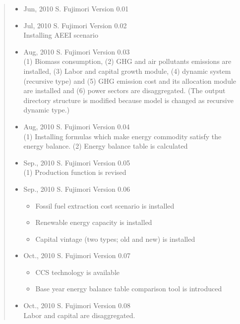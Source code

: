 \documentclass[10pt,a4paper,titlepage,dvipdfmx]{book}
\begin{document}
\begin{quote}
 \begin{itemize}
  \item Jun, 2010 S. Fujimori Version 0.01
  \item Jul, 2010 S. Fujimori Version 0.02 \mbox{}\\
      Installing AEEI scenario

  \item Aug, 2010 S. Fujimori Version 0.03 \mbox{}\\ 
      (1) Biomass consumption, (2) GHG and air pollutants emissions are installed, (3) Labor and capital growth module, (4) dynamic system (recursive type) and (5) GHG emission cost and its allocation module are installed and (6) power sectors are disaggregated.
      (The output directory structure is modified because model is changed as recursive dynamic type.)

  \item Aug, 2010 S. Fujimori Version 0.04 \mbox{}\\
      (1) Installing formulas which make energy commodity satisfy the energy balance. (2) Energy balance table is calculated

  \item Sep., 2010 S. Fujimori Version 0.05 \mbox{}\\
      (1) Production function is revised

  \item Sep., 2010 S. Fujimori Version 0.06
   \begin{itemize}
    \item Fossil fuel extraction cost scenario is installed
    \item Renewable energy capacity is installed
    \item Capital vintage (two types; old and new) is installed
   \end{itemize}

  \item Oct., 2010 S. Fujimori Version 0.07
    \begin{itemize}
      \item CCS technology is available
      \item Base year energy balance table comparison tool is introduced
    \end{itemize}
  \item Oct., 2010 S. Fujimori Version 0.08 \mbox{}\\
     Labor and capital are disaggregated.


\end{itemize}
\end{quote}
\end{document}
